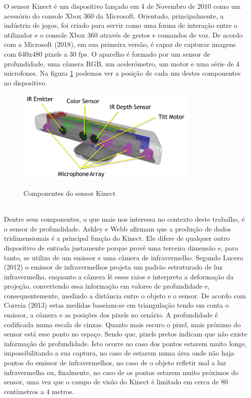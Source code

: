 O sensor Kinect é um dispositivo lançado em 4 de Novembro de 2010 como um acessório do console Xbox 360 da Microsoft. Orientado, principalmente, a indústria de jogos, foi criado para servir como uma forma de interação entre o utilizador e o console Xbox 360 através de gestos e comandos de voz. De acordo com a Microsoft (2018), em sua primeira versão, é capaz de capturar imagens com 640x480 pixels a 30 fps. O aparelho é formado por um sensor de profundidade, uma câmera RGB, um acelerómetro, um motor e uma série de 4 microfones. Na figura \ref{fig:kinect_componentes} podemos ver a posição de cada um destes componentes no dispositivo.

\begin{figure}[H]
    \centering
    \caption{Componentes do sensor Kinect}
	\vspace*{0,2cm}
    \includegraphics[width=0.8\textwidth]{./04-figuras/kinect_componentes}
    \label{fig:kinect_componentes}
\end{figure}
\vspace*{-0,9cm}
{\raggedright {}}\\

Dentre seus componentes, o que mais nos interessa no contexto deste trabalho, é o sensor de profundidade. Ashley e Webb \cite{ashley} afirmam que a produção de dados tridimensionais é a principal função do Kinect. Ele difere de qualquer outro dispositivo de entrada justamente porque provê uma terceira dimensão e, para tanto, se utiliza de um emissor e uma câmera de infravermelho. Segundo Lucero (2012) o emissor de infravermelhos projeta um padrão estruturado de luz infravermelha, enquanto a câmera lê esses raios e interpreta a deformação da projeção, convertendo essa informação em valores de profundidade e, consequentemente, medindo a distância entre o objeto e o sensor. De acordo com Correia (2013) estas medidas baseiam-se em triangulação tendo em conta o emissor, a câmera e as posições dos pixels no cenário. A profundidade é codificada numa escala de cinzas. Quanto mais escuro o pixel, mais próximo do sensor está esse ponto no espaço. Sendo que, pixels pretos indicam que não existe informação de profundidade. Isto ocorre no caso dos pontos estarem muito longe, impossibilitando a sua captura, no caso de estarem numa área onde não haja pontos do emissor de infravermelhos, no caso de o objeto refletir mal a luz infravermelha ou, finalmente, no caso de os pontos estarem muito próximos do sensor, uma vez que o campo de visão do Kinect é limitado em cerca de 80 centímetros a 4 metros.

